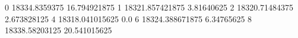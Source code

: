 0 18334.8359375 16.794921875
1 18321.857421875 3.81640625
2 18320.71484375 2.673828125
4 18318.041015625 0.0
6 18324.388671875 6.34765625
8 18338.58203125 20.541015625
